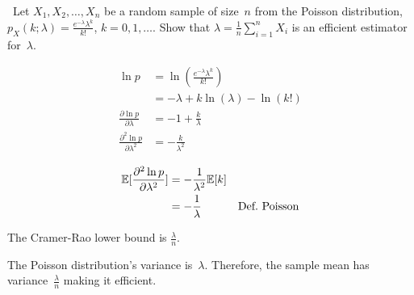 \begin{problem}
  ~Let ${X_1,X_2,\ldots,X_n}$ be a random sample of size~$n$ from the Poisson distribution, ${p_{X}(k;\lambda) = \frac{e^{-\lambda} \lambda^{k}}{k!}}$, ${k=0,1,\ldots}$. Show that ${\hat{\lambda} = \frac{1}{n} \sum_{i=1}^{n} X_i}$ is an efficient estimator for~$\lambda$.
\end{problem}

\begin{align}
  \ln p &= \ln \left( \frac{e^{-\lambda} \lambda^{k}}{k!} \right) \\
        &= -\lambda + k\ln(\lambda) - \ln(k!) \\
  \frac{\partial \ln p}{\partial \lambda} &= -1 +\frac{k}{\lambda} \\
  \frac{\partial^2 \ln p}{\partial \lambda^2} &= -\frac{k}{\lambda^2}
\end{align}

\begin{align}
  \mathbb{E}\lbrack\frac{\partial^2 \ln p}{\partial \lambda^2}\rbrack &= -\frac{1}{\lambda^2} \mathbb{E}\lbrack k\rbrack \\
                                                       &= -\frac{1}{\lambda} & \text{Def.\ Poisson}
\end{align}

The Cramer-Rao lower bound is ${\boxed{\frac{\lambda}{n}}}$.

The Poisson distribution's variance is~$\lambda$.  Therefore, the sample mean has variance~${\frac{\lambda}{n}}$ making it efficient.

